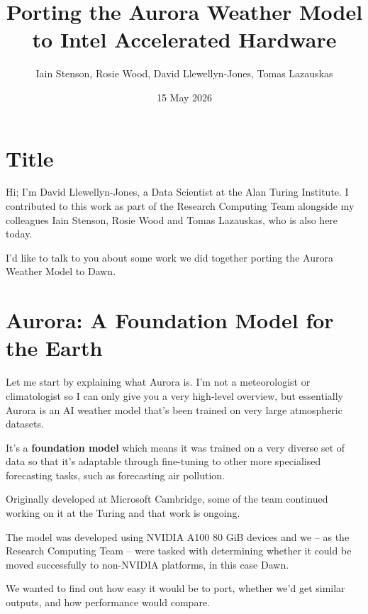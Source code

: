 \documentclass{article}
\begin{document}
\title{Porting the Aurora Weather Model to Intel Accelerated Hardware}
\author{Iain Stenson, Rosie Wood, David Llewellyn-Jones, Tomas Lazauskas}
\date{15 May 2026}


\maketitle


\section{Title}

Hi; I'm David Llewellyn-Jones, a Data Scientist at the Alan Turing Institute. I contributed to this work as part of the Research Computing Team alongside my colleagues Iain Stenson, Rosie Wood and Tomas Lazauskas, who is also here today.

I'd like to talk to you about some work we did together porting the Aurora Weather Model to Dawn.


\section{Aurora: A Foundation Model for the Earth}


Let me start by explaining what Aurora is. I'm not a meteorologist or climatologist so I can only give you a very high-level overview, but essentially Aurora is an AI weather model that's been trained on very large atmospheric datasets.

It's a {\bf foundation model} which means it was trained on a very diverse set of data so that it's adaptable through fine-tuning to other more specialised forecasting tasks, such as forecasting air pollution.

Originally developed at Microsoft Cambridge, some of the team continued working on it at the Turing and that work is ongoing.

The model was developed using NVIDIA A100 80 GiB devices and we -- as the Research Computing Team -- were tasked with determining whether it could be moved successfully to non-NVIDIA platforms, in this case Dawn.

We wanted to find out how easy it would be to port, whether we'd get similar outputs, and how performance would compare.
\end{document}
